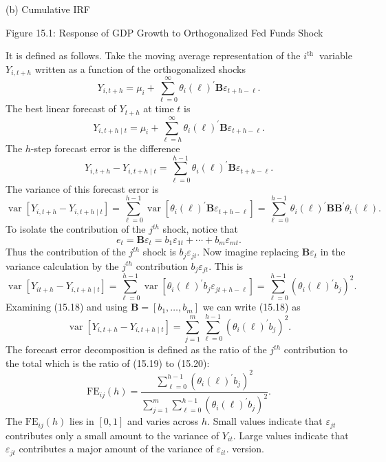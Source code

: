 \documentclass[10pt]{article}
\begin{document}
(b) Cumulative IRF

Figure 15.1: Response of GDP Growth to Orthogonalized Fed Funds Shock

It is defined as follows. Take the moving average representation of the $i^{\text {th }}$ variable $Y_{i, t+h}$ written as a function of the orthogonalized shocks
$$
Y_{i, t+h}=\mu_{i}+\sum_{\ell=0}^{\infty} \theta_{i}(\ell)^{\prime} \boldsymbol{B} \varepsilon_{t+h-\ell} .
$$
The best linear forecast of $Y_{t+h}$ at time $t$ is
$$
Y_{i, t+h \mid t}=\mu_{i}+\sum_{\ell=h}^{\infty} \theta_{i}(\ell)^{\prime} \boldsymbol{B} \varepsilon_{t+h-\ell} .
$$
The $h$-step forecast error is the difference
$$
Y_{i, t+h}-Y_{i, t+h \mid t}=\sum_{\ell=0}^{h-1} \theta_{i}(\ell)^{\prime} \boldsymbol{B} \varepsilon_{t+h-\ell} .
$$
The variance of this forecast error is
$$
\operatorname{var}\left[Y_{i, t+h}-Y_{i, t+h \mid t}\right]=\sum_{\ell=0}^{h-1} \operatorname{var}\left[\theta_{i}(\ell)^{\prime} \boldsymbol{B} \varepsilon_{t+h-\ell}\right]=\sum_{\ell=0}^{h-1} \theta_{i}(\ell)^{\prime} \boldsymbol{B} \boldsymbol{B}^{\prime} \theta_{i}(\ell) .
$$
To isolate the contribution of the $j^{t h}$ shock, notice that
$$
e_{t}=\boldsymbol{B} \varepsilon_{t}=b_{1} \varepsilon_{1 t}+\cdots+b_{m} \varepsilon_{m t} .
$$
Thus the contribution of the $j^{t h}$ shock is $b_{j} \varepsilon_{j t}$. Now imagine replacing $\boldsymbol{B} \varepsilon_{t}$ in the variance calculation by the $j^{t h}$ contribution $b_{j} \varepsilon_{j t}$. This is
$$
\operatorname{var}\left[Y_{i t+h}-Y_{i, t+h \mid t}\right]=\sum_{\ell=0}^{h-1} \operatorname{var}\left[\theta_{i}(\ell)^{\prime} b_{j} \varepsilon_{j t+h-\ell}\right]=\sum_{\ell=0}^{h-1}\left(\theta_{i}(\ell)^{\prime} b_{j}\right)^{2} .
$$
Examining (15.18) and using $\boldsymbol{B}=\left[b_{1}, \ldots, b_{m}\right]$ we can write (15.18) as
$$
\operatorname{var}\left[Y_{i, t+h}-Y_{i, t+h \mid t}\right]=\sum_{j=1}^{m} \sum_{\ell=0}^{h-1}\left(\theta_{i}(\ell)^{\prime} b_{j}\right)^{2} .
$$
The forecast error decomposition is defined as the ratio of the $j^{t h}$ contribution to the total which is the ratio of (15.19) to (15.20):
$$
\mathrm{FE}_{i j}(h)=\frac{\sum_{\ell=0}^{h-1}\left(\theta_{i}(\ell)^{\prime} b_{j}\right)^{2}}{\sum_{j=1}^{m} \sum_{\ell=0}^{h-1}\left(\theta_{i}(\ell)^{\prime} b_{j}\right)^{2}} .
$$
The $\mathrm{FE}_{i j}(h)$ lies in $[0,1]$ and varies across $h$. Small values indicate that $\varepsilon_{j t}$ contributes only a small amount to the variance of $Y_{i t}$. Large values indicate that $\varepsilon_{j t}$ contributes a major amount of the variance of $\varepsilon_{i t}$. version.
\end{document}
